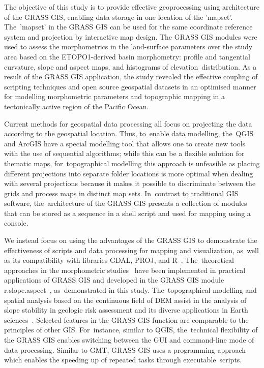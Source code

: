 \documentclass[technologies,article,accept,pdftex,moreauthors]{Definitions/mdpi}
\begin{document}
{The objective of this study is to provide effective geoprocessing using architecture of the GRASS GIS, enabling data storage in one location of the 'mapset'. The~'mapset' in the GRASS GIS can be used for the same coordinate reference system and projection by interactive map design. }The GRASS GIS modules were used to assess the morphometrics in the land-surface parameters over the study area based on the ETOPO1-derived basin morphometry: profile and tangential curvature, slope and aspect maps, and histograms of elevation~distribution. As a result of the GRASS GIS application, the study revealed the effective coupling of scripting techniques and open source geospatial datasets in an optimised manner for modelling morphometric parameters and topographic mapping in a tectonically active region of the Pacific Ocean.

{Current methods for geospatial data processing all focus on projecting the data according to the geospatial location. %
	Thus, to~enable data modelling, the~QGIS and ArcGIS have a special modelling tool that allows one to create new tools with the use of sequential algorithms; while this can be a flexible solution for thematic maps, for~topographical modelling this approach is unfeasible as placing different projections into separate folder locations is more optimal when dealing with several projections because it makes it possible to discriminate between the grids and process maps in distinct map sets. In~contrast to} traditional GIS software, the~architecture of the GRASS GIS presents a collection of modules that can be stored as a sequence in a shell script and used for mapping {using a console}. 

We {instead focus on using the} advantages of the GRASS GIS to demonstrate the effectiveness of scripts {and data processing }for mapping and visualization, as~well as its compatibility with libraries{ }GDAL, PROJ, and R~\cite{Bivand2000,Bivand1999,app122412554,Grohmann}. The~theoretical approaches in {the }morphometric studies~\cite{Chapman} have been implemented in practical applications of GRASS GIS and developed in {the }GRASS {GIS} module r.slope.aspect~\cite{Hofierka2009}, as~demonstrated in this study. The~topographical modelling and spatial analysis based on the continuous field of DEM assist in {the }analysis of slope stability in geologic risk assessment and its diverse applications in Earth sciences~\cite{HofierkaSuri,Mitas1999,Mitasovaetal1996}. {Selected features in the GRASS GIS function are comparable to the principles of other GIS. For~instance, similar to QGIS, the~}technical flexibility of {the }GRASS GIS enables switching between the GUI and command-line mode of data processing. Similar to GMT, GRASS GIS uses a programming approach which enables the speeding up of repeated tasks through executable~scripts. 
\end{document}
